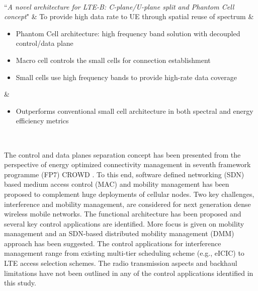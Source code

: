\documentclass[article,10pt,twocolumn]{IEEEtran}
\begin{document}
\begin{table*}[!htb]
\begin{tcolorbox}[tab1,tabularx={>{\raggedright\arraybackslash}p{1.1in}||>{\raggedright\arraybackslash}p{1in}|X|>{\raggedright\arraybackslash}p{1.45in}}]
\begin{itemize}[leftmargin=0.75em]
																																	\vspace*{-\baselineskip}
																																\end{itemize}						\\ \hline
``\textit{A novel architecture for LTE-B: C-plane/U-plane split and Phantom Cell concept}" \citep{6477646,6554746}
					& To provide high data rate to UE through spatial reuse of spectrum
												&\compress\begin{itemize}[leftmargin=1.25em]
													\renewcommand{\labelitemi}{}
													\item Phantom Cell architecture: high frequency band solution with decoupled control/data plane
													\item Macro cell controls the small cells for connection establishment 
													\item Small cells use high frequency bands to provide high-rate data coverage
													\vspace*{-\baselineskip}
												\end{itemize}														
																																& \compress\begin{itemize}[leftmargin=0.75em]
																																	\item Outperforms conventional small cell architecture in both spectral and energy efficiency metrics
																																	\vspace*{-\baselineskip}
																																\end{itemize}						\\  \hline\hline
\end{tcolorbox}
\vspace{-4mm}
\end{table*}

The control and data planes separation concept has been presented from the perspective of energy optimized connectivity management in seventh framework programme (FP7) CROWD \citep{6702534}. To this end, software defined networking (SDN) based medium access control (MAC) and mobility management has been proposed to complement huge deployments of cellular nodes. Two key challenges, interference and mobility management, are considered for next generation dense wireless mobile networks. The functional architecture has been proposed and several key control applications are identified. More focus is given on mobility management and an SDN-based distributed mobility management (DMM) approach has been suggested. The control applications for interference management range from existing multi-tier scheduling scheme (e.g., eICIC) to LTE access selection schemes. The radio transmission aspects and backhaul limitations have not been outlined in any of the control applications identified in this study.
\end{document}
